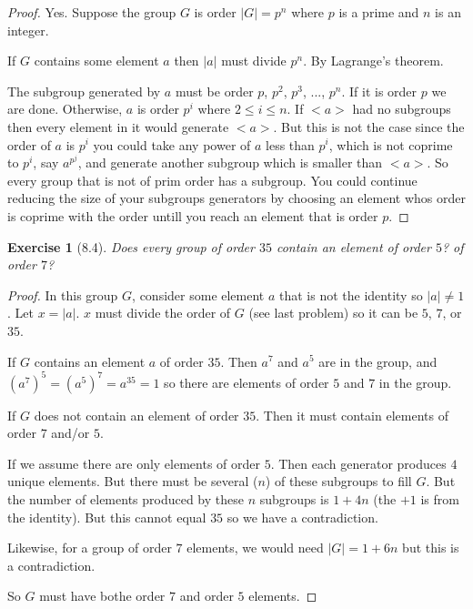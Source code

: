\documentclass[12pt,leqno]{article}
\numberwithin{equation}{section}
\newtheorem*{exer}{Exercise}
\theoremstyle{definition}
\begin{document}
\begin{proof}[Proof]

    Yes. Suppose the group $G$ is order $\vert G \vert = p^n$ where $p$ is a prime
    and $n$ is an integer.

    If $G$ contains some element $a$ then $\vert a \vert$ must divide $p^n$.
    By Lagrange's theorem. 

    The subgroup generated by $a$ must be order $p$, $p^2$, $p^3$, ..., $p^{n}$.
    If it is order $p$ we are done. Otherwise, $a$ is order $p^i$ where $2 \le
    i \le n$. If $<a>$ had no subgroups then every element in it would generate
    $<a>$. But this is not the case since the order of $a$ is $p^i$ you could
    take any power of $a$ less than $p^i$, which is not coprime to $p^i$, say
    $a^{p^{j}}$, and generate another subgroup which is smaller than $<a>$. 
    So every group that is not of prim order has a subgroup. You could continue
    reducing the size of your subgroups generators by choosing an element whos order is coprime
    with the order untill you reach an element that is order $p$. 

\end{proof}

\begin{exer}[8.4] Does every group of order $35$ contain an element of order
    $5$? of order $7$? 

\end{exer}

\begin{proof}[Proof]

    In this group $G$, consider some element $a$ that is not the identity so
    $\vert a \vert \neq 1$. Let $x = \vert a \vert$. $x$ must divide the order
    of $G$ (see last problem) so it can be $5$, $7$, or $35$.

    If $G$ contains an element $a$ of order $35$. Then $a^7$ and $a^5$ are in
    the group, and $(a^7)^5 = (a^5)^7 = a^{35} = 1$ so there are elements of
    order $5$ and $7$ in the group.

    If $G$ does not contain an element of order $35$. Then it must contain
    elements of order $7$ and/or $5$.

    If we assume there are only elements of order $5$. Then each generator
    produces $4$ unique elements.  But there must be several ($n$) of these
    subgroups to fill $G$. But the number of elements produced by these $n$
    subgroups is $1 + 4n$ (the $+1$ is from the identity). But this cannot
    equal $35$ so we have a contradiction.

    Likewise, for a group of order $7$ elements, we would need $\vert G \vert =
    1 + 6n$ but this is a contradiction. 

    So $G$ must have bothe order $7$ and order $5$ elements.

\end{proof}
\end{document}
